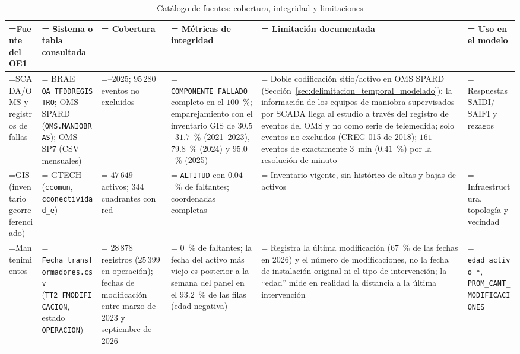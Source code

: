 \begin{landscape}
\begin{table}[!htbp]
\centering\scriptsize
\setlength{\tabcolsep}{3pt}\renewcommand{\arraystretch}{1.05}
\caption{Catálogo de fuentes: cobertura, integridad y limitaciones}
\label{tab:catalogo_fuentes}
\begin{tabularx}{\linewidth}{@{} >{\raggedright\arraybackslash\hsize=0.720\hsize\linewidth=\hsize}X >{\raggedright\arraybackslash\hsize=0.960\hsize\linewidth=\hsize}X >{\raggedright\arraybackslash\hsize=0.780\hsize\linewidth=\hsize}X >{\raggedright\arraybackslash\hsize=1.200\hsize\linewidth=\hsize}X >{\raggedright\arraybackslash\hsize=1.590\hsize\linewidth=\hsize}X >{\raggedright\arraybackslash\hsize=0.750\hsize\linewidth=\hsize}X @{}}
\toprule
\textbf{Fuente del OE1} & \textbf{Sistema o tabla consultada} & \textbf{Cobertura} & \textbf{Métricas de integridad} & \textbf{Limitación documentada} & \textbf{Uso en el modelo} \\
\midrule
SCADA/OMS y registros de fallas & BRAE \texttt{QA\_TFDDREGISTRO}; OMS SPARD (\texttt{OMS.MANIOBRAS}); OMS SP7 (CSV mensuales) & 2021--2025; $95\,280$ eventos no excluidos & \texttt{COMPONENTE\_FALLADO} completo en el $100$~\%; emparejamiento con el inventario GIS de $30{.}5$--$31{.}7$~\% (2021--2023), $79{.}8$~\% (2024) y $95{.}0$~\% (2025) & Doble codificación sitio/activo en OMS SPARD (Sección~\ref{sec:delimitacion_temporal_modelado}); la información de los equipos de maniobra supervisados por SCADA llega al estudio a través del registro de eventos del OMS y no como serie de telemedida; solo eventos no excluidos (CREG 015 de 2018); $161$ eventos de exactamente $3$~min ($0{.}41$~\%) por la resolución de minuto & Respuestas $\mathrm{SAIDI}$/$\mathrm{SAIFI}$ y rezagos \\
\addlinespace[1pt]
GIS (inventario georreferenciado) & GTECH (\texttt{ccomun}, \texttt{cconectividad\_e}) & $47\,649$ activos; $344$ cuadrantes con red & \texttt{ALTITUD} con $0{.}04$~\% de faltantes; coordenadas completas & Inventario vigente, sin histórico de altas y bajas de activos & Infraestructura, topología y vecindad \\
\addlinespace[1pt]
Mantenimientos & \texttt{Fecha\_transformadores.csv} (\texttt{TT2\_FMODIFICACION}, estado \texttt{OPERACION}) & $28\,878$ registros ($25\,399$ en operación); fechas de modificación entre marzo de 2023 y septiembre de 2026 & $0$~\% de faltantes; la fecha del activo más viejo es posterior a la semana del panel en el $93{.}2$~\% de las filas (edad negativa) & Registra la última modificación ($67$~\% de las fechas en 2026) y el número de modificaciones, no la fecha de instalación original ni el tipo de intervención; la ``edad'' mide en realidad la distancia a la última intervención & \texttt{edad\_activo\_*}, \texttt{PROM\_CANT\_MODIFICACIONES} \\

\end{tabularx}
\end{table}
\end{landscape}
